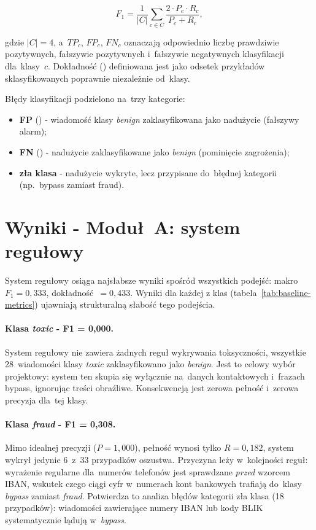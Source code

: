 \begin{equation}
  F_1 = \frac{1}{|C|}\sum_{c \in C} \frac{2 \cdot P_c \cdot R_c}{P_c + R_c},
  \label{eq:f1}
\end{equation}

\noindent gdzie $|C| = 4$, a~$TP_c$, $FP_c$, $FN_c$ oznaczają odpowiednio
liczbę prawdziwie pozytywnych, fałszywie pozytywnych i~fałszywie negatywnych
klasyfikacji dla~klasy~$c$. Dokładność () definiowana jest
jako odsetek przykładów sklasyfikowanych poprawnie niezależnie od~klasy.

Błędy klasyfikacji podzielono na~trzy kategorie:
\begin{itemize}
  \item \textbf{FP} () - wiadomość klasy \textit{benign}
    zaklasyfikowana jako nadużycie (fałszywy alarm);
  \item \textbf{FN} () - nadużycie zaklasyfikowane
    jako \textit{benign} (pominięcie zagrożenia);
  \item \textbf{zła klasa} - nadużycie wykryte, lecz przypisane do~błędnej
    kategorii (np.\ bypass zamiast fraud).
\end{itemize}

\section{Wyniki - Moduł~A: system regułowy}
\label{sec:wyniki-baseline}



System regułowy osiąga najsłabsze wyniki spośród wszystkich podejść:
makro~$F_1 = 0{,}333$, dokładność~$= 0{,}433$.
Wyniki dla każdej z klas (tabela~\ref{tab:baseline-metrics}) ujawniają strukturalną
słabość tego podejścia.

\paragraph{Klasa \textit{toxic} - F1 = 0{,}000.}
System regułowy nie zawiera żadnych reguł wykrywania toksyczności,
wszystkie 28~wiadomości klasy \textit{toxic} zaklasyfikowano jako \textit{benign}.
Jest to celowy wybór projektowy: system ten skupia się wyłącznie na~danych
kontaktowych i~frazach bypass, ignorując treści obraźliwe.
Konsekwencją jest zerowa pełność i~zerowa precyzja dla~tej klasy.

\paragraph{Klasa \textit{fraud} - F1 = 0{,}308.}
Mimo idealnej precyzji ($P = 1{,}000$), pełność wynosi tylko $R = 0{,}182$,
system wykrył jedynie 6~z~33 przypadków oszustwa.
Przyczyna leży w~kolejności reguł: wyrażenie regularne dla~numerów telefonów
jest sprawdzane \emph{przed} wzorcem IBAN, wskutek czego ciągi cyfr w~numerach
kont bankowych trafiają do~klasy \textit{bypass} zamiast \textit{fraud}.
Potwierdza to analiza błędów kategorii zła klasa (18 przypadków):
wiadomości zawierające numery IBAN lub kody BLIK systematycznie lądują
w~\textit{bypass}.

